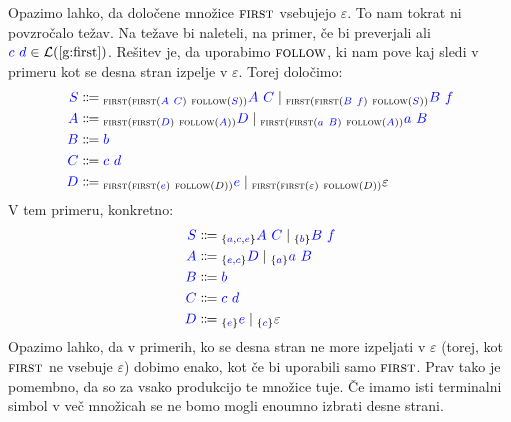 \documentclass{article}
\newcommand{\FIRST}{\textsc{first}}
\newcommand{\FOLLOW}{\textsc{follow}}
\newcommand{\Symbol}[1]{\textcolor{blue}{#1}}
\newcommand{\Null}{\varepsilon}
\newcommand{\Language}[1]{\mathcal{L}(#1)}
\newcommand{\MathRef}[1]{\text{\ref{#1}}}
\newcommand{\Arrow}{\Coloneq}
\newcommand{\Seq}{\ }
\newcommand{\Union}{\mathrel{|}}
\newcommand{\Lookahead}[1]{{}_{\{{#1}\}}}
\newcommand{\Lk}[1]{{}_{{#1}}}
\begin{document}
Opazimo lahko, da določene množice $\FIRST$ vsebujejo $\Null$.
To nam tokrat ni povzročalo težav.
Na težave bi naleteli, na primer, če bi preverjali ali $\Symbol{c} \Seq \Symbol{d} \in \Language{\MathRef{g:first}}$.
Rešitev je, da uporabimo $\FOLLOW$, ki nam pove kaj sledi v primeru kot se desna stran izpelje v $\Null$.
Torej določimo:
\begin{equation*}
  \begin{aligned}
    \Symbol{S} &\Arrow \Lk{\FIRST(\FIRST(\Symbol{A} \Seq \Symbol{C}) \Seq \FOLLOW(\Symbol{S}))} \Symbol{A} \Seq \Symbol{C} \Union \Lk{\FIRST(\FIRST(\Symbol{B} \Seq \Symbol{f}) \Seq \FOLLOW(\Symbol{S}))} \Symbol{B} \Seq \Symbol{f} \\
    \Symbol{A} &\Arrow \Lk{\FIRST(\FIRST(\Symbol{D}) \Seq \FOLLOW(\Symbol{A}))} \Symbol{D} \Union \Lk{\FIRST(\FIRST(\Symbol{a} \Seq \Symbol{B}) \Seq \FOLLOW(\Symbol{A}))} \Symbol{a} \Seq \Symbol{B} \\
    \Symbol{B} &\Arrow \Symbol{b}\\
    \Symbol{C} &\Arrow \Symbol{c} \Seq \Symbol{d}\\
    \Symbol{D} &\Arrow \Lk{\FIRST(\FIRST(\Symbol{e}) \Seq \FOLLOW(D))} \Symbol{e} \Union \Lk{\FIRST(\FIRST(\Null) \Seq \FOLLOW(D))} \Null
  \end{aligned}
\end{equation*}
V tem primeru, konkretno:
\begin{equation*}
  \begin{aligned}
    \Symbol{S} &\Arrow \Lookahead{\Symbol{a}, \Symbol{c}, \Symbol{e}} \Symbol{A} \Seq \Symbol{C} \Union \Lookahead{\Symbol{b}} \Symbol{B} \Seq \Symbol{f} \\
    \Symbol{A} &\Arrow \Lookahead{\Symbol{e}, \Symbol{c}} \Symbol{D} \Union \Lookahead{\Symbol{a}} \Symbol{a} \Seq \Symbol{B} \\
    \Symbol{B} &\Arrow \Symbol{b}\\
    \Symbol{C} &\Arrow \Symbol{c} \Seq \Symbol{d}\\
    \Symbol{D} &\Arrow \Lookahead{\Symbol{e}} \Symbol{e} \Union \Lookahead{\Symbol{c}} \Null
  \end{aligned}
\end{equation*}
Opazimo lahko, da v primerih, ko se desna stran ne more izpeljati v $\Null$ (torej, kot $\FIRST$ ne vsebuje $\Null$) dobimo enako, kot če bi uporabili samo $\FIRST$.
Prav tako je pomembno, da so za vsako produkcijo te množice tuje.
Če imamo isti terminalni simbol v več množicah se ne bomo mogli enoumno izbrati desne strani.
\end{document}
